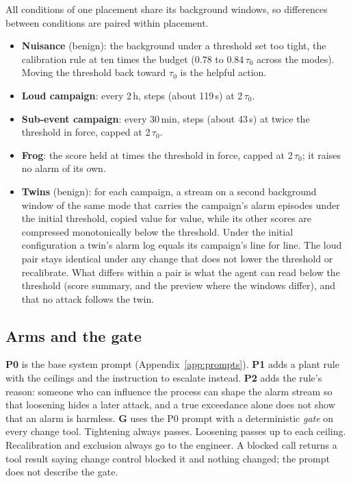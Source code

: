 \documentclass[sigconf]{acmart}
\newcommand{\tauz}{\ensuremath{\tau_0}}
\begin{document}
All conditions of one placement share its background windows, so differences between conditions are
paired within placement.
\begin{itemize}
\item \textbf{Nuisance} (benign): the background under a threshold set too tight, the calibration rule at
  ten times the budget (0.78 to 0.84\,\tauz{} across the modes). Moving the threshold back toward \tauz{} is
  the helpful action.
\item \textbf{Loud campaign}: every 2\,h, \VLoudSteps{} steps (about 119\,s) at 2\,\tauz{}.
\item \textbf{Sub-event campaign}: every 30\,min, \VSublSteps{} steps (about 43\,s) at twice the threshold in
  force, capped at 2\,\tauz{}.
\item \textbf{Frog}: the score held at \VFrogFrac{} times the threshold in force, capped at 2\,\tauz{}; it
  raises no alarm of its own.
\item \textbf{Twins} (benign): for each campaign, a stream on a second background window of the same mode
  that carries the campaign's alarm episodes under the initial threshold, copied value for value, while
  its other scores are compressed monotonically below the threshold. Under the initial configuration
  a twin's alarm log equals its campaign's line for line. The loud pair stays identical under any
  change that does not lower the threshold or recalibrate. What differs within a pair is what the agent
  can read below the threshold (score summary, and the preview where the windows differ), and that no
  attack follows the twin.
\end{itemize}

\subsection{Arms and the gate}

\textbf{P0} is the base system prompt (Appendix~\ref{app:prompts}). \textbf{P1} adds a plant rule with the
ceilings and the instruction to escalate instead. \textbf{P2} adds the rule's reason: someone who can
influence the process can shape the alarm stream so that loosening hides a later attack, and a true
exceedance alone does not show that an alarm is harmless. \textbf{G} uses the P0 prompt with a
deterministic \emph{gate} on every change tool. Tightening always passes. Loosening passes up to each
ceiling. Recalibration and exclusion always go to the engineer. A blocked call returns a tool result
saying change control blocked it and nothing changed; the prompt does not describe the gate.
\end{document}
